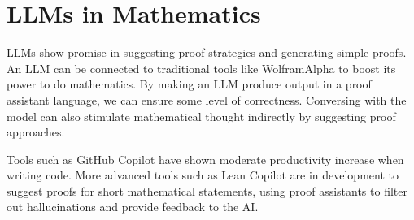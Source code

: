 \documentclass{article}
\begin{document}
\section{LLMs in Mathematics}

LLMs show promise in suggesting proof strategies and generating simple
proofs. An LLM can be connected to traditional tools like WolframAlpha to boost
its power to do mathematics. By making an LLM produce output in a proof
assistant language, we can ensure some level of correctness. Conversing
with the model can also stimulate mathematical thought indirectly
by suggesting proof approaches.

Tools such as GitHub Copilot have shown moderate productivity increase
when writing code. More advanced tools such as Lean Copilot are in development
to suggest proofs for short mathematical statements, using proof assistants
to filter out hallucinations and provide feedback to the AI.
\end{document}
